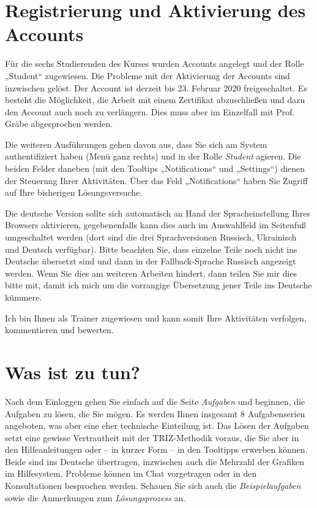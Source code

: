\documentclass[11pt,a4paper]{article}
\begin{document}
\section{Registrierung und Aktivierung des Accounts}

Für die sechs Studierenden des Kurses wurden Accounts angelegt und der Rolle
„Student“ zugewiesen.  Die Probleme mit der Aktivierung der Accounts sind
inzwischen gelöst. Der Account ist derzeit bis 23. Februar 2020
freigeschaltet.  Es besteht die Möglichkeit, die Arbeit mit einem Zertifikat
abzuschließen und dazu den Account auch noch zu verlängern. Dies muss aber im
Einzelfall mit Prof. Gräbe abgesprochen werden. 

Die weiteren Ausführungen gehen davon aus, dass Sie sich am System
authentifiziert haben (Menü ganz rechts) und in der Rolle \emph{Student}
agieren.  Die beiden Felder daneben (mit den Tooltips „Notifications“ und
„Settings“) dienen der Steuerung Ihrer Aktivitäten. Über das Feld
„Notifications“ haben Sie Zugriff auf Ihre bisherigen Lösungsversuche.

Die deutsche Version sollte sich automatisch an Hand der Spracheinstellung
Ihres Browsers aktivieren, gegebenenfalls kann dies auch im Auswahlfeld im
Seitenfuß umgeschaltet werden (dort sind die drei Sprachversionen Russisch,
Ukrainisch und Deutsch verfügbar).  Bitte beachten Sie, dass einzelne Teile
noch nicht ins Deutsche übersetzt sind und dann in der Fallback-Sprache
Russisch angezeigt werden. Wenn Sie dies am weiteren Arbeiten hindert, dann
teilen Sie mir dies bitte mit, damit ich mich um die vorrangige Übersetzung
jener Teile ins Deutsche kümmere.

Ich bin Ihnen als Trainer zugewiesen und kann somit Ihre Aktivitäten
verfolgen, kommentieren und bewerten.

\section{Was ist zu tun?}

Nach dem Einloggen gehen Sie einfach auf die Seite \emph{Aufgaben} und
beginnen, die Aufgaben zu lösen, die Sie mögen.  Es werden Ihnen insgesamt 8
Aufgabenserien angeboten, was aber eine eher technische Einteilung ist.  Das
Lösen der Aufgaben setzt eine gewisse Vertrautheit mit der TRIZ-Methodik
voraus, die Sie aber in den Hilfeanleitungen oder -- in kurzer Form -- in den
Tooltipps erwerben können. Beide sind ins Deutsche übertragen, inzwischen auch
die Mehrzahl der Grafiken im Hilfesystem. Probleme können im Chat vorgetragen
oder in den Konsultationen besprochen werden.  Schauen Sie sich auch die
\emph{Beispielaufgaben} sowie die Anmerkungen zum \emph{Lösungsprozess} an.
\end{document}
